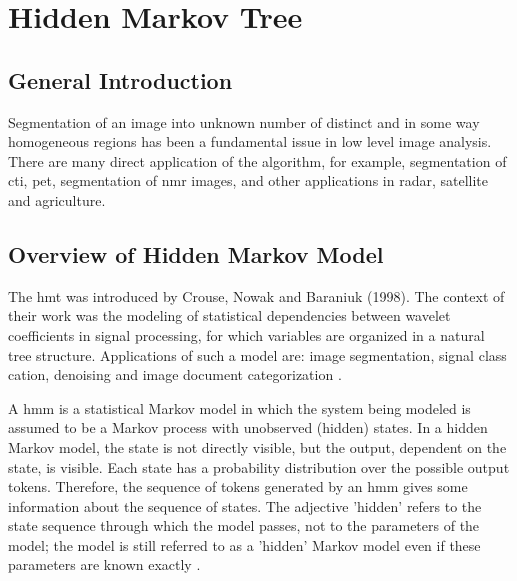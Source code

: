 \section{Hidden Markov Tree}
\subsection{General Introduction}
Segmentation of an image into unknown number of distinct and in some way homogeneous regions has been a fundamental issue in low level image analysis. There are many direct application of the algorithm, for example, segmentation of \gls{cti}, \gls{pet}, segmentation of \gls{nmr} images, and other applications in radar, satellite and agriculture.

\subsection{Overview of Hidden Markov Model}
The \gls{hmt} was introduced by Crouse, Nowak and Baraniuk (1998). The context of their work was the modeling of statistical dependencies between wavelet coefficients in signal processing, for which variables are organized in a natural tree structure. Applications of such a model are: image segmentation, signal class cation, denoising and image document categorization \cite{durand2001statistical}.

A \gls{hmm} is a statistical Markov model in which the system being modeled is assumed to be a Markov process with unobserved (hidden) states. In a hidden Markov model, the state is not directly visible, but the output, dependent on the state, is visible. Each state has a probability distribution over the possible output tokens. Therefore, the sequence of tokens generated by an \gls{hmm} gives some information about the sequence of states. The adjective 'hidden' refers to the state sequence through which the model passes, not to the parameters of the model; the model is still referred to as a 'hidden' Markov model even if these parameters are known exactly \cite{jezicagent}. 

